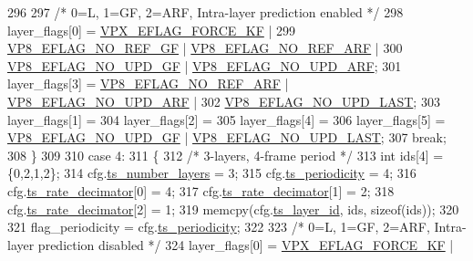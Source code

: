 \begin{DoxyCodeInclude}
{{{{{{{{{{{{{{{296 
297         \textcolor{comment}{/* 0=L, 1=GF, 2=ARF, Intra-layer prediction enabled */}
298         layer\_flags[0] = \hyperlink{group__encoder_ga4c4f4e3cbb5225d2c6c050e2d1e948fa}{VPX\_EFLAG\_FORCE\_KF}  |
299                          \hyperlink{group__vp8__encoder_gabb5e95343a2738abef44eca13059da33}{VP8\_EFLAG\_NO\_REF\_GF} | 
      \hyperlink{group__vp8__encoder_ga650ab0baea12be91082226a5cc18776a}{VP8\_EFLAG\_NO\_REF\_ARF} |
300                          \hyperlink{group__vp8__encoder_gab01d066c5236457d345ce1cab4c41d6b}{VP8\_EFLAG\_NO\_UPD\_GF} | 
      \hyperlink{group__vp8__encoder_ga1cff46a5287e73a620660030d40b9e6c}{VP8\_EFLAG\_NO\_UPD\_ARF};
301         layer\_flags[3] = \hyperlink{group__vp8__encoder_ga650ab0baea12be91082226a5cc18776a}{VP8\_EFLAG\_NO\_REF\_ARF} | 
      \hyperlink{group__vp8__encoder_ga1cff46a5287e73a620660030d40b9e6c}{VP8\_EFLAG\_NO\_UPD\_ARF} |
302                                                 \hyperlink{group__vp8__encoder_ga602edb6b02a89cb2db7a16d6dffba583}{VP8\_EFLAG\_NO\_UPD\_LAST};
303         layer\_flags[1] =
304         layer\_flags[2] =
305         layer\_flags[4] =
306         layer\_flags[5] = \hyperlink{group__vp8__encoder_gab01d066c5236457d345ce1cab4c41d6b}{VP8\_EFLAG\_NO\_UPD\_GF} | 
      \hyperlink{group__vp8__encoder_ga602edb6b02a89cb2db7a16d6dffba583}{VP8\_EFLAG\_NO\_UPD\_LAST};
307         \textcolor{keywordflow}{break};
308     \}
309 
310     \textcolor{keywordflow}{case} 4:
311     \{
312         \textcolor{comment}{/* 3-layers, 4-frame period */}
313         \textcolor{keywordtype}{int} ids[4] = \{0,2,1,2\};
314         cfg.\hyperlink{structvpx__codec__enc__cfg_a16d4549a30cbd585e3c3056ef873d8c7}{ts\_number\_layers}     = 3;
315         cfg.\hyperlink{structvpx__codec__enc__cfg_a4ec338780115dd270acf0dac24193474}{ts\_periodicity}       = 4;
316         cfg.\hyperlink{structvpx__codec__enc__cfg_ad40c30846ef8ef1d8684f10a491ec535}{ts\_rate\_decimator}[0] = 4;
317         cfg.\hyperlink{structvpx__codec__enc__cfg_ad40c30846ef8ef1d8684f10a491ec535}{ts\_rate\_decimator}[1] = 2;
318         cfg.\hyperlink{structvpx__codec__enc__cfg_ad40c30846ef8ef1d8684f10a491ec535}{ts\_rate\_decimator}[2] = 1;
319         memcpy(cfg.\hyperlink{structvpx__codec__enc__cfg_a4d105d2470dbfb7210b33d298f1cf1f6}{ts\_layer\_id}, ids, \textcolor{keyword}{sizeof}(ids));
320 
321         flag\_periodicity = cfg.\hyperlink{structvpx__codec__enc__cfg_a4ec338780115dd270acf0dac24193474}{ts\_periodicity};
322 
323         \textcolor{comment}{/* 0=L, 1=GF, 2=ARF, Intra-layer prediction disabled */}
324         layer\_flags[0] = \hyperlink{group__encoder_ga4c4f4e3cbb5225d2c6c050e2d1e948fa}{VPX\_EFLAG\_FORCE\_KF}  |
}}}}}}}}}}}}}}}
\end{DoxyCodeInclude}
